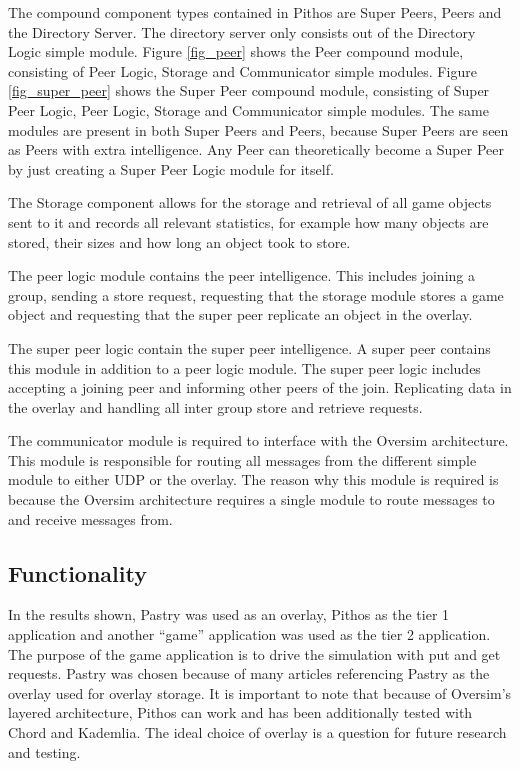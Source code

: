 \documentclass[10pt,a4paper,conference]{IEEEtran}
\begin{document}
The compound component types contained in Pithos are Super Peers, Peers and the Directory Server. The directory server only consists out of the
Directory Logic simple module. Figure \ref{fig_peer} shows the Peer compound module, consisting of Peer Logic, Storage and Communicator simple
modules. Figure \ref{fig_super_peer} shows the Super Peer compound module, consisting of Super Peer Logic, Peer Logic, Storage and Communicator
simple modules. The same modules are present in both Super Peers and Peers, because Super Peers are seen as Peers with extra intelligence. Any Peer
can theoretically become a Super Peer by just creating a Super Peer Logic module for itself.

The Storage component allows for the storage and retrieval of all game objects sent to it and records all relevant statistics, for example how many
objects are stored, their sizes and how long an object took to store.

The peer logic module contains the peer intelligence. This includes joining a group, sending a store request, requesting that the storage module
stores a game object and requesting that the super peer replicate an object in the overlay.

The super peer logic contain the super peer intelligence. A super peer contains this module in addition to a peer logic module. The super peer logic
includes accepting a joining peer and informing other peers of the join. Replicating data in the overlay and handling all inter group store and
retrieve requests.

The communicator module is required to interface with the Oversim architecture. This module is responsible for routing all messages from the
different simple module to either UDP or the overlay. The reason why this module is required is because the Oversim architecture requires a single
module to route messages to and receive messages from.

\subsection{Functionality}

In the results shown, Pastry was used as an overlay, Pithos as the tier 1 application and another ``game'' application was used as the tier 2
application. The purpose of the game application is to drive the simulation with put and get requests. Pastry was chosen because of many articles
referencing Pastry as the overlay used for overlay storage. It is important to note that because of Oversim's layered architecture, Pithos can work
and has been additionally tested with Chord and Kademlia. The ideal choice of overlay is a question for future research and testing.
\end{document}
